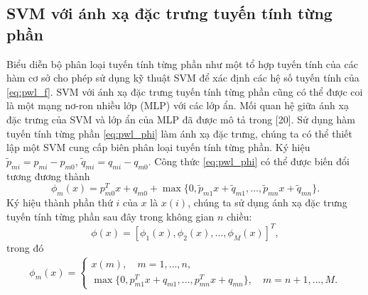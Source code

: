 \subsection{SVM với ánh xạ đặc trưng tuyến tính từng phần}
Biểu diễn bộ phân loại tuyến tính từng phần như một tổ hợp tuyến tính của các hàm cơ sở cho phép sử dụng kỹ thuật SVM để xác định các hệ số tuyến tính của \eqref{eq:pwl_f}. SVM với ánh xạ đặc trưng tuyến tính từng phần cũng có thể được coi là một mạng nơ-ron nhiều lớp (MLP) với các lớp ẩn. Mối quan hệ giữa ánh xạ đặc trưng của SVM và lớp ẩn của MLP đã được mô tả trong [20]. Sử dụng hàm tuyến tính từng phần \eqref{eq:pwl_phi} làm ánh xạ đặc trưng, chúng ta có thể thiết lập một SVM cung cấp biên phân loại tuyến tính từng phần. Ký hiệu \( \tilde{p}_{mi}=p_{mi}-p_{m0} \), \( \tilde{q}_{mi}=q_{mi}-q_{m0} \). Công thức \eqref{eq:pwl_phi} có thể được biến đổi tương đương thành
\[
\phi_m(x) = p^T_{m0}x + q_{m0} + \max \{0, \tilde{p}_{m1}x+\tilde{q}_{m1}, \ldots, \tilde{p}_{mn}x+\tilde{q}_{mn}\}.
\]
Ký hiệu thành phần thứ \(i\) của \(x\) là \(x(i)\), chúng ta sử dụng ánh xạ đặc trưng tuyến tính từng phần sau đây trong không gian \(n \) chiều:
\[
    \phi(x)=[\phi_1(x), \phi_2(x), \ldots, \phi_M(x)]^T,
\]
trong đó
\begin{align}
    \phi_m(x) = \begin{cases}
        x(m), \quad m = 1,\ldots,n, \\
        \max \{0, p^T_{m1}x+q_{m1}, \ldots, p^T_{mn}x+q_{mn}\}, \quad m = n+1,\ldots,M.
    \end{cases}
    \label{eq:phi_mx}
\end{align}

